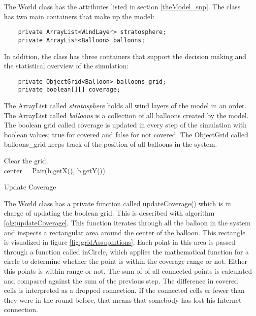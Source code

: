 The World class has the attributes listed in section \ref{theModel_snp}. The class has two main containers that make up the model:

\begin{lstlisting}
	private ArrayList<WindLayer> stratosphere;
	private ArrayList<Balloon> balloons;

\end{lstlisting}

In addition, the class has three containers that support the decision making and the statistical overview of the simulation:
\begin{lstlisting}
	private ObjectGrid<Balloon> balloons_grid;
	private boolean[][] coverage;
	\end{lstlisting}
The ArrayList called \textit{stratosphere} holds all wind layers of the model in an order. The ArrayList called \textit{balloons} is a collection of all balloons created by the model. The boolean grid called coverage is updated in every step of the simulation with boolean values; true for covered and false for not covered. The ObjectGrid called balloons\_grid keeps track of the position of all balloons in the system.


\begin{algorithm}[H]
    Clear the grid.\\
    {center = Pair(b.getX(), b.getY())\\
    }
 \caption{Update Coverage}
 \label{alg:updateCoverage}
\end{algorithm}

The World class has a private function called updateCoverage() which is in charge of updating the boolean grid. This is described with algorithm \ref{alg:updateCoverage}. This function iterates through all the balloon in the system and inspects a rectangular area around the center of the balloon. This rectangle is visualized in figure \ref{fig:gridAssupmtions}. Each point in this area is passed through a function called inCircle, which applies the mathematical function for a circle to determine whether the point is within the coverage range or not. Either this points is within range or not. The sum of of all connected points is calculated and compared against the sum of the previous step. The difference in covered cells is interpreted as a dropped connection. If the connected cells er fewer than they were in the round before, that means that somebody has lost his Internet connection.

